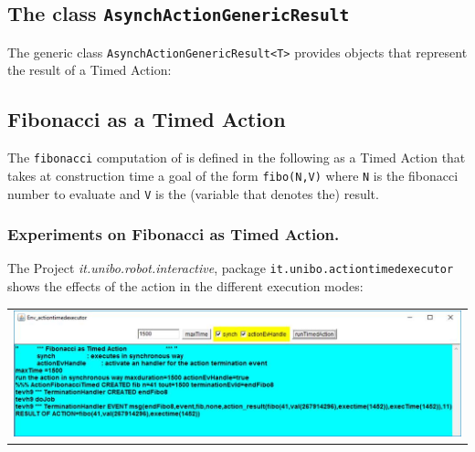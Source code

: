 \subsection{The class \texttt{AsynchActionGenericResult}}

The generic class \texttt{AsynchActionGenericResult<T>} provides objects that represent the result of a Timed Action:




\subsection{Fibonacci as a Timed Action}

The \texttt{fibonacci} computation of  is defined in the following as a Timed Action that takes at construction time a goal of the form \texttt{fibo(N,V)} where \texttt{N} is the fibonacci number to evaluate and \texttt{V} is the (variable that denotes the) result.



\subsubsection{Experiments on Fibonacci as Timed Action.}

The Project \textit{it.unibo.robot.interactive}, package \texttt{it.unibo.actiontimedexecutor} shows the effects of the action in the different execution modes:
 
\begin{center}
\begin{tabular}{ c }
     \includegraphics[scale = 0.6]{img/actionTimed.jpg}\\
\end{tabular} 
\end{center}



